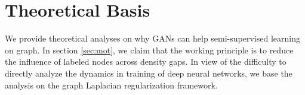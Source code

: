 \section{Theoretical Basis}\label{sec:theory}
We provide theoretical analyses on why GANs can help semi-supervised learning on graph. In section \ref{sec:mot}, we claim that the working principle is to reduce the influence of labeled nodes across density gaps. In view of the difficulty to directly analyze the dynamics in training of deep neural networks,  
we base the analysis on the graph Laplacian regularization framework. 


